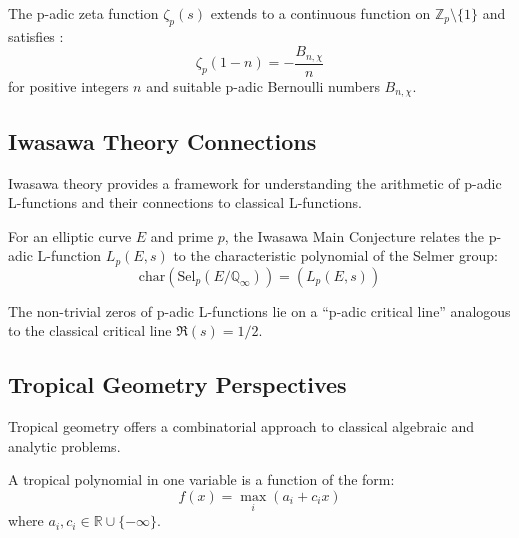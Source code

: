 \begin{theorem}
\label{thm:kubota_leopoldt}
The p-adic zeta function $\zeta_p(s)$ extends to a continuous function on $\mathbb{Z}_p \setminus \{1\}$ and satisfies \cite{iwanieckowalski2004}:
\begin{equation}
\zeta_p(1-n) = -\frac{B_{n,\chi}}{n}
\label{eq:kubota_leopoldt}
\end{equation}
for positive integers $n$ and suitable p-adic Bernoulli numbers $B_{n,\chi}$.
\end{theorem}

\subsection{Iwasawa Theory Connections}

Iwasawa theory provides a framework for understanding the arithmetic of p-adic L-functions and their connections to classical L-functions.

\begin{definition}
\label{def:iwasawa_main}
For an elliptic curve $E$ and prime $p$, the Iwasawa Main Conjecture relates the p-adic L-function $L_p(E,s)$ to the characteristic polynomial of the Selmer group:
\begin{equation}
\text{char}(\text{Sel}_p(E/\mathbb{Q}_{\infty})) = (L_p(E,s))
\label{eq:iwasawa_main}
\end{equation}
\end{definition}

\begin{conjecture}
\label{conj:padic_rh}
The non-trivial zeros of p-adic L-functions lie on a ``p-adic critical line'' analogous to the classical critical line $\Re(s) = 1/2$.
\end{conjecture}

\subsection{Tropical Geometry Perspectives}

Tropical geometry offers a combinatorial approach to classical algebraic and analytic problems.

\begin{definition}
\label{def:tropical_polynomial}
A tropical polynomial in one variable is a function of the form:
\begin{equation}
f(x) = \max_{i} (a_i + c_i x)
\label{eq:tropical_polynomial}
\end{equation}
where $a_i, c_i \in \mathbb{R} \cup \{-\infty\}$.
\end{definition}

